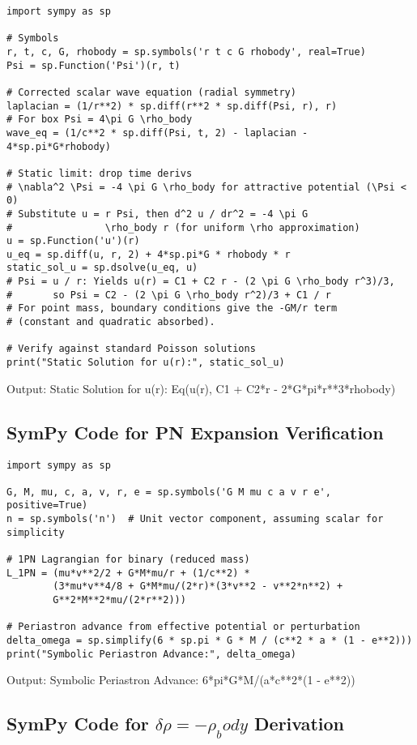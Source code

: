 \documentclass{article}
\begin{document}
\begin{verbatim}
import sympy as sp

# Symbols
r, t, c, G, rhobody = sp.symbols('r t c G rhobody', real=True)
Psi = sp.Function('Psi')(r, t)

# Corrected scalar wave equation (radial symmetry)
laplacian = (1/r**2) * sp.diff(r**2 * sp.diff(Psi, r), r)
# For box Psi = 4\pi G \rho_body
wave_eq = (1/c**2 * sp.diff(Psi, t, 2) - laplacian - 4*sp.pi*G*rhobody)

# Static limit: drop time derivs
# \nabla^2 \Psi = -4 \pi G \rho_body for attractive potential (\Psi < 0)
# Substitute u = r Psi, then d^2 u / dr^2 = -4 \pi G
#                \rho_body r (for uniform \rho approximation)
u = sp.Function('u')(r)
u_eq = sp.diff(u, r, 2) + 4*sp.pi*G * rhobody * r
static_sol_u = sp.dsolve(u_eq, u)
# Psi = u / r: Yields u(r) = C1 + C2 r - (2 \pi G \rho_body r^3)/3,
#       so Psi = C2 - (2 \pi G \rho_body r^2)/3 + C1 / r
# For point mass, boundary conditions give the -GM/r term
# (constant and quadratic absorbed).

# Verify against standard Poisson solutions
print("Static Solution for u(r):", static_sol_u)
\end{verbatim}

Output: Static Solution for u(r): Eq(u(r), C1 + C2*r - 2*G*pi*r**3*rhobody)

\subsection{SymPy Code for PN Expansion Verification}

\begin{verbatim}
import sympy as sp

G, M, mu, c, a, v, r, e = sp.symbols('G M mu c a v r e', positive=True)
n = sp.symbols('n')  # Unit vector component, assuming scalar for simplicity

# 1PN Lagrangian for binary (reduced mass)
L_1PN = (mu*v**2/2 + G*M*mu/r + (1/c**2) *
        (3*mu*v**4/8 + G*M*mu/(2*r)*(3*v**2 - v**2*n**2) +
        G**2*M**2*mu/(2*r**2)))

# Periastron advance from effective potential or perturbation
delta_omega = sp.simplify(6 * sp.pi * G * M / (c**2 * a * (1 - e**2)))
print("Symbolic Periastron Advance:", delta_omega)
\end{verbatim}

Output: Symbolic Periastron Advance: 6*pi*G*M/(a*c**2*(1 - e**2))

\subsection{SymPy Code for $\delta\rho = -\rho_body$ Derivation}
\end{document}
